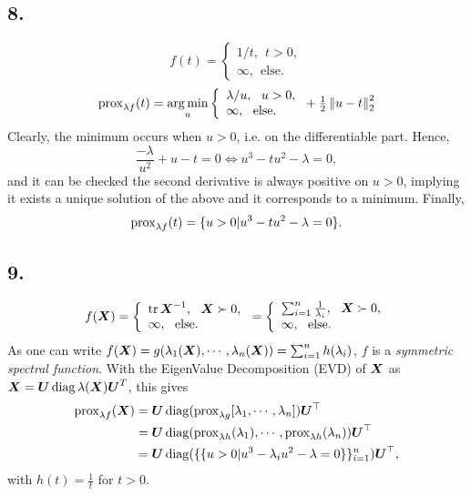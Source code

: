 \subsection{8.}
%
\begin{equation*}
    f(t) = \left\{
        \begin{array}{ll}
          1/t,~~t>0, \\
            \infty,~~ \text{else}.
        \end{array}
      \right.
\end{equation*}
%
\begin{equation*}
    \operatorname{prox}_{\lambda f}(t) = \operatorname*{arg\,min}_u \left\{
        \begin{array}{ll}
            \lambda/{ u},~~u>0, \\
            \infty,~~ \text{else}.
        \end{array}
    \right. + {\textstyle\frac{1}{2}} \left\lVert u-t\right\rVert_{2}^2 
\end{equation*}
%
Clearly, the minimum occurs when $u>0$, i.e. on the differentiable part. Hence,
%
\begin{equation*}
    \frac{-\lambda}{u^2} + u - t = 0 \Leftrightarrow 
    u^3 - tu^2-\lambda=0,
\end{equation*}
and it can be checked the second derivative is always positive on $u>0$, implying it exists a unique solution of the above and it corresponds to a minimum. Finally,
%
\begin{equation}
    \operatorname{prox}_{\lambda f}(t) = \{ u>0 | u^3 
    - tu^2-\lambda=0  \}.
\end{equation}
%
\subsection{9.}
%
\begin{equation*}
    f(\boldsymbol X) = \left\{
        \begin{array}{ll}
          \operatorname{tr} \boldsymbol X^{-1},~~\boldsymbol X \succ 0, \\
            \infty,~~ \text{else}.
        \end{array}
    \right.
    = \left\{
        \begin{array}{ll}
        \sum_{i=1}^n {\textstyle\frac{1}{\lambda_i}},~~\boldsymbol X \succ 0, \\
            \infty,~~ \text{else}.
        \end{array}
    \right. 
\end{equation*}
%
As one can write $f(\boldsymbol X) = g(\lambda_1(\boldsymbol X), \cdots,
\lambda_n(\boldsymbol X)) = \sum_{i=1}^n h(\lambda_i)$, $f$ is a \emph{symmetric spectral function}.
%
With the EigenValue Decomposition (EVD) of $\boldsymbol X$ as 
$\boldsymbol X = \boldsymbol U \operatorname{diag}{\lambda (\boldsymbol X)} \boldsymbol U^T$, this gives
%
\begin{align*}
\begin{split}
    \operatorname{prox}_{\lambda f} (\boldsymbol X) &= \boldsymbol U \operatorname{diag}(\operatorname{prox}_{\lambda g} 
    [\lambda_1,\cdots, \lambda_n]) \boldsymbol U^\top \\
    &= \boldsymbol U \operatorname{diag}(\operatorname{prox}_{\lambda h} (\lambda_1), \cdots,
    \operatorname{prox}_{\lambda h} (\lambda_n)) \boldsymbol U^\top \\
    &= \boldsymbol U \operatorname{diag}(\{\{ u>0| u^3-\lambda_i u^2-\lambda=0 \}\}_{i=1}^n)
    \boldsymbol U^\top,
\end{split}
\end{align*}
with $h(t)=\frac{1}{t}$ for $t>0$. 
%
